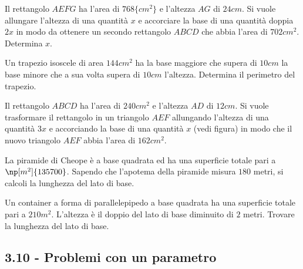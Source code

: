 \begin{multicols}{2}
\begin{esercizio}[\Ast]
 \label{ese:3.146}
Il rettangolo $ AEFG $ ha l'area di $ 768\{cm^2\} $ e l'altezza $ AG $ di $ 24\unit{cm} $. Si
vuole allungare l'altezza di una quantità
$ x $ e accorciare la base di una quantità doppia $ 2x $ in modo da ottenere un
secondo rettangolo $ ABCD $ che abbia l'area di $ 702\unit{cm^2} $. Determina $ x $.
\end{esercizio}

\begin{esercizio}
 \label{ese:3.147}
Un trapezio isoscele di area $ 144\unit{cm^2} $ ha la base maggiore che supera di $ 10\unit{cm} $
la base minore che a sua volta supera di $ 10\unit{cm} $ l'altezza. Determina il perimetro del trapezio.
\end{esercizio}

\begin{esercizio}[\Ast]
 \label{ese:3.148}
Il rettangolo $ ABCD $ ha l'area di $ 240\unit{cm^2} $ e l'altezza $ AD $ di $ 12\unit{cm} $. Si
vuole trasformare il rettangolo in un triangolo $ AEF $ allungando l'altezza di una quantità $ 3x $ e accorciando la
base di una quantità $ x $ (vedi figura) in modo che il nuovo triangolo $ AEF $ abbia l'area di $ 162\unit{cm^2} $.
\begin{center}
 
\end{center}
\end{esercizio}

\begin{esercizio}[\Ast]
 \label{ese:3.149}
La piramide di Cheope è a base quadrata ed ha una superficie totale pari a
$\np[m^2]{135700}$. Sapendo che l'apotema della piramide misura $ 180 $ metri, si
calcoli la lunghezza del lato di base.
\end{esercizio}

\begin{esercizio}[\Ast]
 \label{ese:3.150}
Un container a forma di parallelepipedo a base quadrata ha una superficie
totale pari a $ 210\unit{m^2} $. L'altezza è il doppio del lato di base diminuito di
$ 2 $ metri. Trovare la lunghezza del lato di base.
\end{esercizio}

\subsection*{3.10 - Problemi con un parametro}


\end{multicols}
